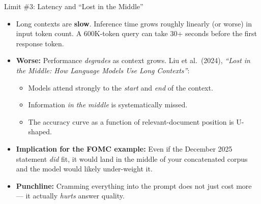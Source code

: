 \documentclass[10pt,english,aspectratio=169]{beamer}
\begin{document}
\begin{frame}{Limit \#3: Latency and ``Lost in the Middle''}
\begin{itemize}
\item Long contexts are \textbf{slow}. Inference time grows roughly linearly (or worse) in input token count. A 600K-token query can take 30+ seconds before the first response token.

\medskip
\item \textbf{Worse:} Performance \emph{degrades} as context grows. Liu et al.\ (2024), \emph{``Lost in the Middle: How Language Models Use Long Contexts''}:
\begin{itemize}
    \item Models attend strongly to the \emph{start} and \emph{end} of the context.
    \item Information \emph{in the middle} is systematically missed.
    \item The accuracy curve as a function of relevant-document position is U-shaped.
\end{itemize}

\medskip
\item \textbf{Implication for the FOMC example:} Even if the December 2025 statement \emph{did} fit, it would land in the middle of your concatenated corpus and the model would likely under-weight it.

\medskip
\item \textbf{Punchline:} Cramming everything into the prompt does not just cost more --- it actually \emph{hurts} answer quality.
\end{itemize}
\end{frame}
\end{document}
